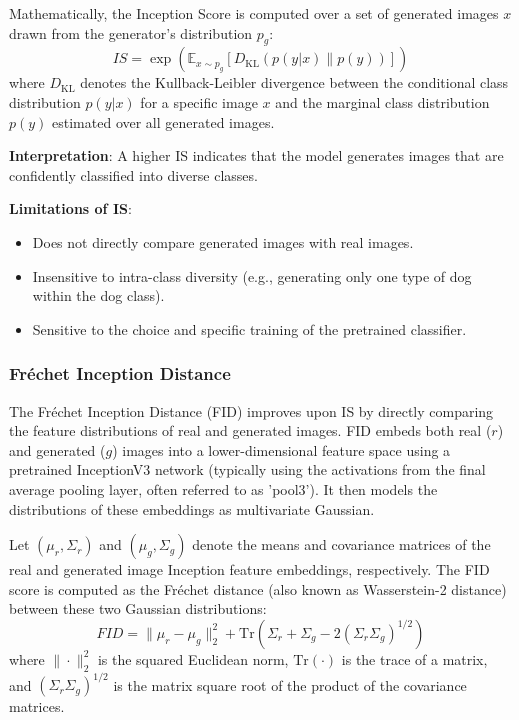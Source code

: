 \noindent
Mathematically, the Inception Score is computed over a set of generated images \(x\) drawn from the generator's distribution \(p_g\):
\begin{equation}
IS = \exp \left( \mathbb{E}_{x \sim p_g} \left[ D_{\text{KL}}(p(y|x) \| p(y)) \right] \right)
\end{equation}
where \( D_{\text{KL}} \) denotes the Kullback-Leibler divergence between the conditional class distribution \(p(y|x)\) for a specific image \(x\) and the marginal class distribution \(p(y)\) estimated over all generated images. 

\noindent\textbf{Interpretation}:
A higher IS indicates that the model generates images that are confidently classified into diverse classes.

\noindent\textbf{Limitations of IS}:
\begin{itemize}
    \item Does not directly compare generated images with real images.
    \item Insensitive to intra-class diversity (e.g., generating only one type of dog within the dog class).
    \item Sensitive to the choice and specific training of the pretrained classifier.
\end{itemize}

\subsubsection[Fréchet Inception Distance - FID]{Fréchet Inception Distance}

The Fréchet Inception Distance (FID) \cite{heusel2018ganstrainedtimescaleupdate} improves upon IS by directly comparing the feature distributions of real and generated images. FID embeds both real (\(r\)) and generated (\(g\)) images into a lower-dimensional feature space using a pretrained InceptionV3 network (typically using the activations from the final average pooling layer, often referred to as 'pool3'). It then models the distributions of these embeddings as multivariate Gaussian.

Let \( (\mu_r, \Sigma_r) \) and \( (\mu_g, \Sigma_g) \) denote the means and covariance matrices of the real and generated image Inception feature embeddings, respectively. The FID score is computed as the Fréchet distance (also known as Wasserstein-2 distance) between these two Gaussian distributions:
\begin{equation}
FID = \| \mu_r - \mu_g \|^2_2 + \text{Tr} \left( \Sigma_r + \Sigma_g - 2(\Sigma_r \Sigma_g)^{1/2} \right)
\end{equation}
where \( \|\cdot\|^2_2 \) is the squared Euclidean norm, \( \text{Tr}(\cdot) \) is the trace of a matrix, and \( (\Sigma_r \Sigma_g)^{1/2} \) is the matrix square root of the product of the covariance matrices.

